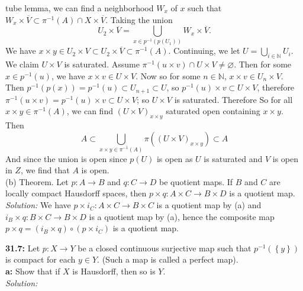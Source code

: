 \documentclass[a4paper]{article}
\begin{document}
        tube lemma, we can find a neighborhood $W_x$ of $x$ such that
        $W_x \times \overline{V} \subset \pi^{-1}(A) \cap X \times
        \overline{V}$. Taking the union 
        \[
        U_2 \times \overline{V} = \bigcup_{x \in p^{-1}\left( p(U_1) \right) } 
        W_x \times \overline{V}.
        \] 
        We have $x \times y \in U_2 \times V \subset U_2 \times \overline{V}
        \subset \pi^{-1}(A)$.
        Continuing, we let $U = \bigcup_{i \in \mathbb{N}} U_i$.
        We claim $U \times V$ is saturated.
        Assume $\pi^{-1}\left( u \times v \right) \cap U \times V \neq
        \varnothing$. Then for some $x \in p^{-1}\left( u \right) $, we have
        $x \times v \in U \times V$. Now so for some  $n \in \mathbb{N}$, 
        $x \times v \in U_n \times V$. Then
        $p^{-1}\left( p(x) \right) = p^{-1}(u) \subset U_{n+1} \subset U$, so
        $p ^{-1}(u) \times v \subset U \times V$, therefore
        $\pi^{-1}\left( u\times v \right) =
        p^{-1}(u) \times v \subset U \times V$; so $U \times V$ is saturated.
        Therefore
        So for all $x \times y \in \pi^{-1}(A)$, we can find
        $(U \times V)_{x \times y}$ saturated open containing $x \times y$.
        Then
         \[
        A \subset \bigcup_{x \times y \in \pi^{-1}(A)} \pi \left( \left(
        U \times V \right)_{x \times y} \right)  
        \subset A
        \] 
        And since the union is open since $p(U)$ is open as $U$ is saturated
        and $V$ is open in $Z$, we find that $A$ is open.\\
        \linebreak
        (b) Theorem. Let $p  \colon A \to B$ and $q  \colon C\to D$ be quotient
        maps. If $B$ and $C$ are locally compact Hausdorff spaces, then
        $p \times q  \colon A \times C \to B \times D$ is a quotient map.\\
        \linebreak
        \textit{Solution:} We have 
        $p \times i_C  \colon A \times C \to B \times C$ is a quotient map by
        (a) and
        $i_B \times q  \colon B \times C \to B \times D$ is a quotient map by
        (a), hence the composite map
        $p \times q = (i_B \times q) \circ \left( p \times i_C \right) $ 
        is a quotient map.
        



        \textbf{31.7:} Let $p  \colon X \to Y$ be a closed continuous
        surjective map such that $p^{-1} \left( \left\{ y \right\}  \right)
        $ is compact for each $y \in Y$. (Such a map is called a perfect
        map).\\
        \textbf{a:} Show that if $X$ is Hausdorff, then so is $Y$.\\
        \textit{Solution:}
\end{document}
